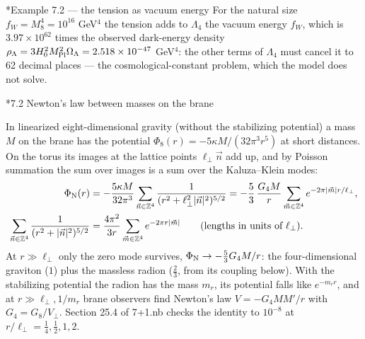 \documentclass[10pt,a4paper]{article}
\makeatletter
\renewcommand\subsection{\@startsection{subsection}{2}{\z@}{-3.25ex\@plus -1ex \@minus -.2ex}{1.5ex \@plus .2ex}{\normalfont\large\bfseries\raggedright}}
\renewcommand\subsubsection{\@startsection{subsubsection}{3}{\z@}{-3.25ex\@plus -1ex \@minus -.2ex}{1.5ex \@plus .2ex}{\normalfont\normalsize\bfseries\raggedright}}
\makeatother
\begin{document}
\subsubsection*{Example 7.2 — the tension as vacuum energy}
For the natural size $f_W=M_8^4=10^{16}$ GeV$^4$ the tension adds to $\Lambda_4$ the vacuum energy $f_W$, which is $3.97\times10^{62}$ times the observed dark-energy density $\rho_\Lambda=3H_0^2M_{\rm Pl}^2\Omega_\Lambda=2.518\times10^{-47}$ GeV$^4$: the other terms of $\Lambda_4$ must cancel it to 62 decimal places — the cosmological-constant problem, which the model does not solve.

\subsection*{7.2 Newton’s law between masses on the brane}
In linearized eight-dimensional gravity (without the stabilizing potential) a mass $M$ on the brane has the potential $\Phi_8(r)=-5\kappa M/(32\pi^3r^5)$ at short distances. On the torus its images at the lattice points $\ell_\perp\vec n$ add up, and by Poisson summation the sum over images is a sum over the Kaluza–Klein modes:
\begin{align*}
\Phi_{\rm N}(r)&=-\frac{5\kappa M}{32\pi^3}\sum_{\vec n\in\mathbb Z^4}\frac1{(r^2+\ell_\perp^2|\vec n|^2)^{5/2}}=-\frac53\,\frac{G_4M}r\sum_{\vec m\in\mathbb Z^4}e^{-2\pi|\vec m|r/\ell_\perp}, \\
\sum_{\vec n\in\mathbb Z^4}\frac1{(r^2+|\vec n|^2)^{5/2}}&=\frac{4\pi^2}{3r}\sum_{\vec m\in\mathbb Z^4}e^{-2\pi r|\vec m|}\qquad(\text{lengths in units of }\ell_\perp).
\end{align*}
At $r\gg\ell_\perp$ only the zero mode survives, $\Phi_{\rm N}\to-\frac53G_4M/r$: the four-dimensional graviton ($1$) plus the massless radion ($\frac23$, from its coupling below). With the stabilizing potential the radion has the mass $m_r$, its potential falls like $e^{-m_rr}$, and at $r\gg\ell_\perp,1/m_r$ brane observers find Newton’s law $V=-G_4MM'/r$ with $G_4=G_8/V_\perp$. Section 25.4 of 7+1.nb checks the identity to $10^{-8}$ at $r/\ell_\perp=\frac14,\frac12,1,2$.
\end{document}
